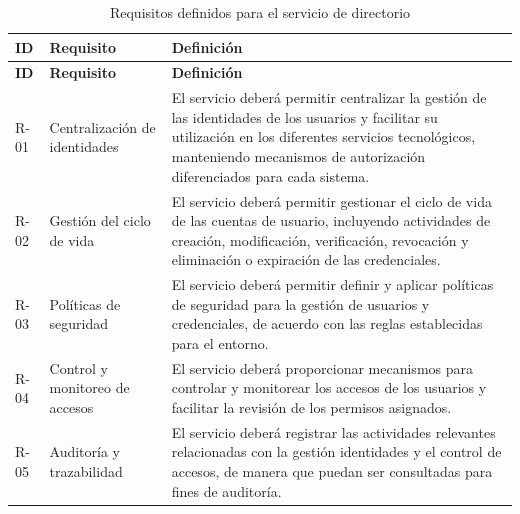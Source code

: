 \begingroup
\fontsize{8.5pt}{9.5pt}\selectfont
\renewcommand{\arraystretch}{1.3}
\setlength{\tabcolsep}{4pt}

\begin{longtable}{|
	>{\centering\arraybackslash}p{1.1cm}|
	>{\raggedright\arraybackslash}p{3.2cm}|
	>{\raggedright\arraybackslash}p{9.2cm}|}

	\caption{Requisitos definidos para el servicio de directorio}
	\label{tab:requisitos}
	\\
	\hline
	\tableheader
	\textbf{ID}                         &
	\textbf{Requisito}                  &
	\textbf{Definición}
	\\
	\hline
	\endfirsthead

	\hline
	\tableheader
	\textbf{ID}                         &
	\textbf{Requisito}                  &
	\textbf{Definición}
	\\
	\hline
	\endhead

	R-01                                &
	Centralización de identidades       &
	El servicio deberá permitir centralizar la gestión de las identidades de los usuarios y facilitar su utilización en los diferentes servicios tecnológicos, manteniendo mecanismos de autorización diferenciados para cada sistema.
	\\
	\hline

	R-02                                &
	Gestión del ciclo de vida           &
	El servicio deberá permitir gestionar el ciclo de vida de las cuentas de usuario, incluyendo actividades de creación, modificación, verificación, revocación y eliminación o expiración de las credenciales.
	\\
	\hline

	R-03                                &
	Políticas de seguridad              &
	El servicio deberá permitir definir y aplicar políticas de seguridad para la gestión de usuarios y credenciales, de acuerdo con las reglas establecidas para el entorno.
	\\
	\hline

	R-04                                &
	Control y monitoreo de accesos      &
	El servicio deberá proporcionar mecanismos para controlar y monitorear los accesos de los usuarios y facilitar la revisión de los permisos asignados.
	\\
	\hline

	R-05                                &
	Auditoría y trazabilidad            &
	El servicio deberá registrar las actividades relevantes relacionadas con la gestión identidades y el control de accesos, de manera que puedan ser consultadas para fines de auditoría.
	\\
	\hline


\end{longtable}
